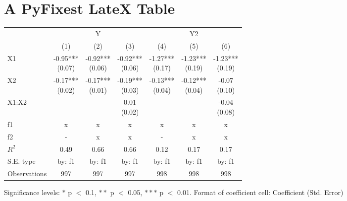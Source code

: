 \documentclass{article}%
\begin{document}
%
\normalsize%
\section{A PyFixest LateX Table}%
\label{sec:APyFixestLateXTable}%


\begin{table}[htbp]%
\renewcommand\cellalign{t}
\begin{threeparttable}
\begin{tabular}{lcccccc}
\toprule
 & \multicolumn{3}{c}{Y} & \multicolumn{3}{c}{Y2} \\
\cmidrule(lr){2-4} \cmidrule(lr){5-7}
 & (1) & (2) & (3) & (4) & (5) & (6) \\
\midrule
X1 & \makecell{-0.95*** \\ (0.07)} & \makecell{-0.92*** \\ (0.06)} & \makecell{-0.92*** \\ (0.06)} & \makecell{-1.27*** \\ (0.17)} & \makecell{-1.23*** \\ (0.19)} & \makecell{-1.23*** \\ (0.19)} \\
X2 & \makecell{-0.17*** \\ (0.02)} & \makecell{-0.17*** \\ (0.01)} & \makecell{-0.19*** \\ (0.03)} & \makecell{-0.13*** \\ (0.04)} & \makecell{-0.12*** \\ (0.04)} & \makecell{-0.07 \\ (0.10)} \\
X1:X2 &  &  & \makecell{0.01 \\ (0.02)} &  &  & \makecell{-0.04 \\ (0.08)} \\
\midrule
f1 & x & x & x & x & x & x \\
f2 & - & x & x & - & x & x \\
\midrule
$R^2$ & 0.49 & 0.66 & 0.66 & 0.12 & 0.17 & 0.17 \\
S.E. type & by: f1 & by: f1 & by: f1 & by: f1 & by: f1 & by: f1 \\
Observations & 997 & 997 & 997 & 998 & 998 & 998 \\
\bottomrule
\end{tabular}
\footnotesize Significance levels: $*$ p $<$ 0.1, $**$ p $<$ 0.05, $***$ p $<$ 0.01. Format of coefficient cell: Coefficient
 (Std. Error)
\end{threeparttable}%
\end{table}

%
\end{document}
